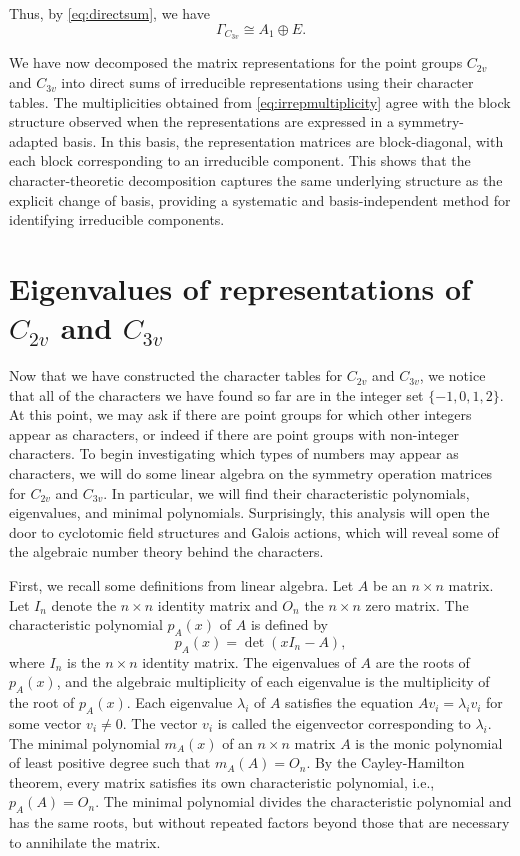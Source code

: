 \documentclass{article}
\begin{document}
    Thus, by \eqref{eq:directsum}, we have
    \[
        \Gamma_{C_{3v}} \cong A_1 \oplus E.
    \]

    We have now decomposed the matrix representations for the point groups $C_{2v}$ and $C_{3v}$ into direct sums of irreducible representations using their character tables. The multiplicities obtained from \eqref{eq:irrepmultiplicity} agree with the block structure observed when the representations are expressed in a symmetry-adapted basis. In this basis, the representation matrices are block-diagonal, with each block corresponding to an irreducible component. This shows that the character-theoretic decomposition captures the same underlying structure as the explicit change of basis, providing a systematic and basis-independent method for identifying irreducible components.

    \section{Eigenvalues of representations of \texorpdfstring{$C_{2v}$ and $C_{3v}$}{C2v and C3v}}

    Now that we have constructed the character tables for $C_{2v}$ and $C_{3v}$, we notice that all of the characters we have found so far are in the integer set $\{-1,0,1,2\}$. At this point, we may ask if there are point groups for which other integers appear as characters, or indeed if there are point groups with non-integer characters. To begin investigating which types of numbers may appear as characters, we will do some linear algebra on the symmetry operation matrices for $C_{2v}$ and $C_{3v}$. In particular, we will find their characteristic polynomials, eigenvalues, and minimal polynomials. Surprisingly, this analysis will open the door to cyclotomic field structures and Galois actions, which will reveal some of the algebraic number theory behind the characters.

    First, we recall some definitions from linear algebra. Let $A$ be an $n\times n$ matrix. Let $I_n$ denote the $n\times n$ identity matrix and $O_n$ the $n\times n$ zero matrix. The characteristic polynomial $p_A(x)$ of $A$ is defined by \[p_A(x)=\det(xI_n-A),\] where $I_n$ is the $n\times n$ identity matrix. The eigenvalues of $A$ are the roots of $p_A(x)$, and the algebraic multiplicity of each eigenvalue is the multiplicity of the root of $p_A(x)$. Each eigenvalue $\lambda_i$ of $A$ satisfies the equation $Av_i=\lambda_iv_i$ for some vector $v_i\neq 0$. The vector $v_i$ is called the eigenvector corresponding to $\lambda_i$. The minimal polynomial $m_{A}(x)$ of an $n\times n$ matrix $A$ is the monic polynomial of least positive degree such that $m_{A}(A)=O_n$. \cite{friedberg2018linear} By the Cayley-Hamilton theorem, every matrix satisfies its own characteristic polynomial, i.e., $p_A(A)=O_n$. The minimal polynomial divides the characteristic polynomial and has the same roots, but without repeated factors beyond those that are necessary to annihilate the matrix.
    
\end{document}
